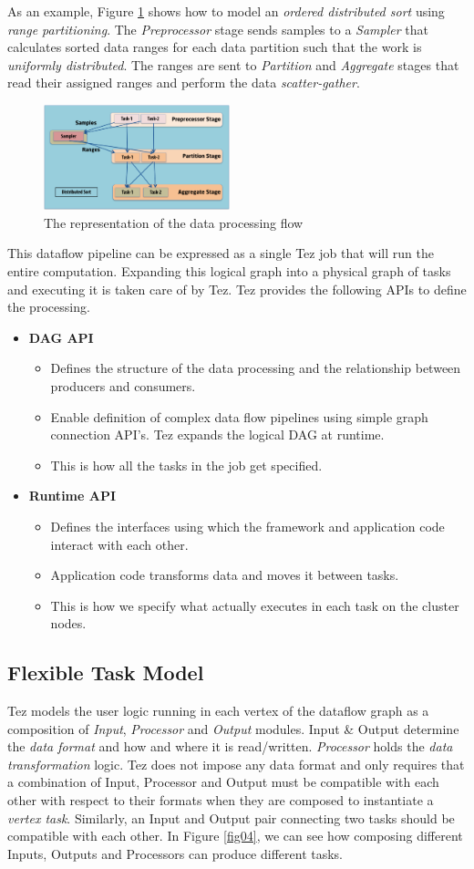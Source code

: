 \documentclass[twocolumn]{article}
\newcommand{\bi}{\begin{itemize}}
\newcommand{\ei}{\end{itemize}}
\newcommand{\ii}{\item}
\begin{document}
As an example, Figure \ref{fig03} shows how to model an \emph{ordered distributed sort} using
\emph{range partitioning}. The \emph{Preprocessor} stage sends samples
to a \emph{Sampler} that calculates sorted data ranges for each data
partition such that the work is \emph{uniformly distributed}. The ranges
are sent to \emph{Partition} and \emph{Aggregate} stages that read
their assigned ranges and perform the data \emph{scatter-gather}. 

\begin{figure}[htb]
        \centering
        \includegraphics[width=0.48\textwidth]{tez1}
        \caption{The representation of the data processing flow}
        \label{fig03}
\end{figure}


This dataflow pipeline can be expressed as a single Tez job that will run the
entire computation. Expanding this logical graph into a physical graph
of tasks and executing it is taken care of by Tez.
Tez provides the following APIs to define the processing.

\bi
\ii \textbf{DAG API}
\bi
\ii Defines the structure of the data processing and the relationship between producers and consumers.
\ii Enable definition of complex data flow pipelines using simple graph connection API’s. Tez expands the logical DAG at runtime.
\ii This is how all the tasks in the job get specified.
\ei
\ii \textbf{Runtime API}
\bi
\ii Defines the interfaces using which the framework and application code interact with each other.
\ii Application code transforms data and moves it between tasks.
\ii This is how we specify what actually executes in each task on the cluster nodes.
\ei
\ei

\subsection{Flexible Task Model}
Tez models the user logic running in each vertex of the dataflow graph
as a composition of \emph{Input}, \emph{Processor} and
\emph{Output} modules. Input \& Output determine the \emph{data
format} and how and where it is read/written. \emph{Processor} holds the
\emph{data transformation} logic. Tez does not impose any data format
and only requires that a combination of Input, Processor and Output must
be compatible with each other with respect to their formats when they
are composed to instantiate a \emph{vertex task}. Similarly, an Input
and Output pair connecting two tasks should be compatible with each
other. In Figure \ref{fig04}, we can see how composing different Inputs,
Outputs and Processors can produce different tasks.
\end{document}
